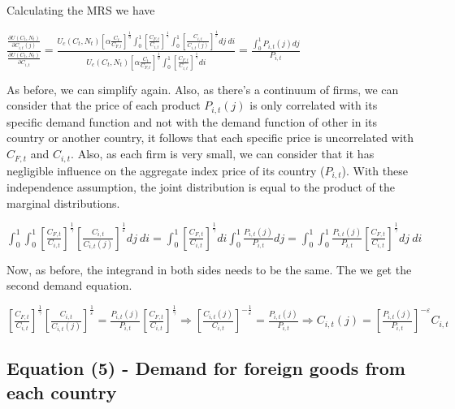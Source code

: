 \documentclass[
]{article}
\begin{document}
Calculating the MRS we have

\(\displaystyle \frac{\displaystyle \frac{\partial U(C_t,N_t)}{\displaystyle \partial C_{i,t}(j)}}{\frac{\displaystyle \partial U(C_t,N_t)}{\displaystyle \partial C_{i,t}}} = \frac{\displaystyle U_c(C_t,N_t) \left[ \alpha \frac{C_t}{C_{F,t}} \right]^{\frac{1}{\eta}} \int_0^1 \left[\frac{C_{F,t}}{C_{i,t}}\right]^{\frac{1}{\gamma}} \int_0^1 \left[\frac{C_{i,t}}{C_{i,t}(j)}\right]^{\frac{1}{\varepsilon}}dj \ di }{\displaystyle U_c(C_t,N_t) \left[ \alpha \frac{C_t}{C_{F,t}} \right]^{\frac{1}{\eta}} \int_0^1 \left[\frac{C_{F,t}}{C_{i,t}}\right]^{\frac{1}{\gamma}} di} = \frac{\displaystyle \int_0^1P_{i,t}(j)dj}{P_{i,t}}\)

As before, we can simplify again. Also, as there's a continuum of firms,
we can consider that the price of each product \(P_{i,t}(j)\) is only
correlated with its specific demand function and not with the demand
function of other in its country or another country, it follows that
each specific price is uncorrelated with \(C_{F,t}\) and \(C_{i,t}\).
Also, as each firm is very small, we can consider that it has negligible
influence on the aggregate index price of its country (\(P_{i,t}\)).
With these independence assumption, the joint distribution is equal to
the product of the marginal distributions.

\(\displaystyle \int_0^1 \int_0^1 \left[\frac{C_{F,t}}{C_{i,t}}\right]^{\frac{1}{\gamma}} \left[\frac{C_{i,t}}{C_{i,t}(j)}\right]^{\frac{1}{\varepsilon}}dj \ di = \int_0^1 \left[\frac{C_{F,t}}{C_{i,t}}\right]^{\frac{1}{\gamma}} di \int_0^1 \frac{\displaystyle P_{i,t}(j)}{P_{i,t}}dj = \int_0^1 \int_0^1 \frac{\displaystyle P_{i,t}(j)}{P_{i,t}} \left[\frac{C_{F,t}}{C_{i,t}}\right]^{\frac{1}{\gamma}} dj \ di\)

Now, as before, the integrand in both sides needs to be the same. The we
get the second demand equation.

\(\displaystyle \left[\frac{C_{F,t}}{C_{i,t}}\right]^{\frac{1}{\gamma}} \left[\frac{C_{i,t}}{C_{i,t}(j)}\right]^{\frac{1}{\varepsilon}} = \frac{\displaystyle P_{i,t}(j)}{P_{i,t}} \left[\frac{C_{F,t}}{C_{i,t}}\right]^{\frac{1}{\gamma}} \Rightarrow \left[\frac{C_{i,t}(j)}{C_{i,t}}\right]^{-\frac{1}{\varepsilon}} = \frac{\displaystyle P_{i,t}(j)}{P_{i,t}} \Rightarrow C_{i,t}(j) = \left[ \frac{\displaystyle P_{i,t}(j)}{P_{i,t}} \right]^{-\varepsilon}C_{i,t}\)

\vspace{12pt}

\hypertarget{equation-5---demand-for-foreign-goods-from-each-country}{%
\subsection{Equation (5) - Demand for foreign goods from each
country}\label{equation-5---demand-for-foreign-goods-from-each-country}}
\end{document}
